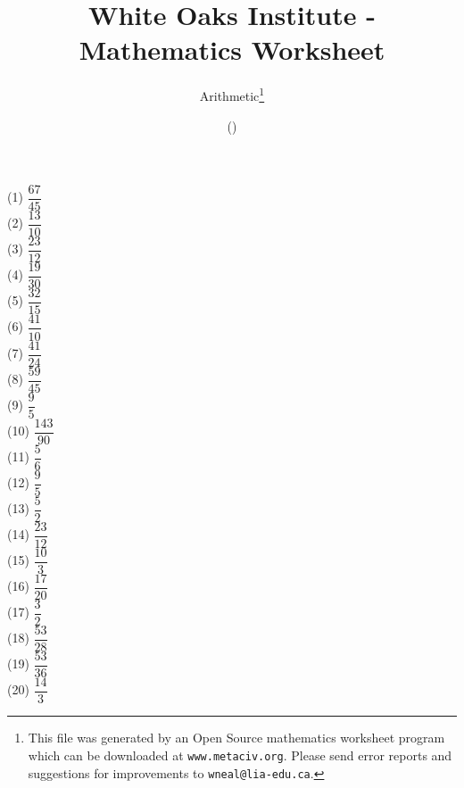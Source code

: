 \documentclass[letter]{article}
\begin{document}
\title{White Oaks Institute - Mathematics Worksheet}
\author{Arithmetic\thanks{This file was generated by an \textsf{Open Source} mathematics worksheet program which can be downloaded at \texttt{www.metaciv.org}. Please send error reports and suggestions for improvements to \texttt{wneal@lia-edu.ca}.}}
\date{\XCfileversion{} (\XCfiledate)}
\maketitle
\setlength{\parskip}{12mm plus 4mm minus 4mm}\setlength{\parindent}{0cm}\begin{multicols}{2}(1) $\dfrac{67}{45}$\\(2) $\dfrac{13}{10}$\\(3) $\dfrac{23}{12}$\\(4) $\dfrac{19}{30}$\\(5) $\dfrac{32}{15}$\\(6) $\dfrac{41}{10}$\\(7) $\dfrac{41}{24}$\\(8) $\dfrac{59}{45}$\\(9) $\dfrac{9}{5}$\\(10) $\dfrac{143}{90}$\\(11) $\dfrac{5}{6}$\\(12) $\dfrac{9}{5}$\\(13) $\dfrac{5}{2}$\\(14) $\dfrac{23}{12}$\\(15) $\dfrac{10}{3}$\\(16) $\dfrac{17}{20}$\\(17) $\dfrac{3}{2}$\\(18) $\dfrac{53}{28}$\\(19) $\dfrac{53}{36}$\\(20) $\dfrac{14}{3}$\\\end{multicols}
\end{document}
